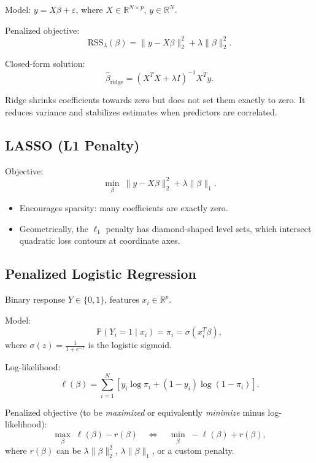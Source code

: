 \documentclass[11pt]{article}
\begin{document}
Model: $y = X\beta + \varepsilon$, where $X \in \mathbb{R}^{N\times p}$, $y \in \mathbb{R}^{N}$.

Penalized objective:
\[
    \text{RSS}_\lambda(\beta) = \|y - X\beta\|_2^2 + \lambda \|\beta\|_2^2.
\]

Closed-form solution:
\[
    \hat{\beta}_{\text{ridge}} = (X^T X + \lambda I)^{-1} X^T y.
\]

Ridge shrinks coefficients towards zero but does not set them exactly to zero. It reduces variance and stabilizes estimates when predictors are correlated.

\subsection{LASSO (L1 Penalty)}

Objective:
\[
    \min_\beta \ \|y - X\beta\|_2^2 + \lambda \|\beta\|_1.
\]

\begin{itemize}
    \item Encourages sparsity: many coefficients are exactly zero.
    \item Geometrically, the $\ell_1$ penalty has diamond-shaped level sets, which intersect quadratic loss contours at coordinate axes.
\end{itemize}

\subsection{Penalized Logistic Regression}

Binary response $Y \in \{0,1\}$, features $x_i \in \mathbb{R}^p$.

Model:
\[
    \mathbb{P}(Y_i = 1 \mid x_i) = \pi_i = \sigma(x_i^T \beta),
\]
where $\sigma(z) = \frac{1}{1+e^{-z}}$ is the logistic sigmoid.

Log-likelihood:
\[
    \ell(\beta) = \sum_{i=1}^N \left[ y_i \log \pi_i + (1-y_i)\log(1-\pi_i) \right].
\]

Penalized objective (to be \emph{maximized} or equivalently \emph{minimize} minus log-likelihood):
\[
    \max_\beta \; \ell(\beta) - r(\beta)
    \quad \Leftrightarrow \quad
    \min_\beta \; -\ell(\beta) + r(\beta),
\]
where $r(\beta)$ can be $\lambda \|\beta\|_2^2$, $\lambda \|\beta\|_1$, or a custom penalty.

\end{document}
